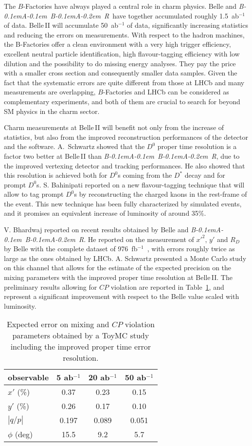\documentclass{PoS}
\def\babar{\mbox{\slshape B\kern-0.1em{\smaller A}\kern-0.1em
    B\kern-0.1em{\smaller A\kern-0.2em R}}}
\newcommand{\CP}{{\ensuremath{C\!P}}\xspace}
\newcommand{\Dz}{\ensuremath{D^0}\xspace}
\begin{document}
The $B$-Factories have always played a central role in charm
physics. Belle and \babar\ have together accumulated  roughly 1.5~ab$^{-1}$ of data. Belle\,II will accumulate 50~ab$^{-1}$ of data, significantly increasing
 statistics and reducing the errors on measurements.
With respect to the hadron machines, the B-Factories offer a clean
environment with a very high trigger efficiency, excellent neutral particle
identification, high flavour-tagging efficiency with low dilution and the
possibility to do missing energy analyses. They pay the price with a smaller
cross section and consequently smaller data samples. Given the fact
that the systematic
errors are quite different from those at LHCb and many measurements are
overlapping, $B$-Factories
and LHCb can be considered as complementary experiments, and both of them are crucial
to search for beyond SM physics in the charm sector.

Charm measurements at Belle\,II will benefit not only from the increase of
statistics, but also from the improved reconstruction performances of
the detector and the software. A.~Schwartz showed that the \Dz proper
time resolution is a factor two better at Belle\,II than \babar, due
to the improved vertexing detector and tracking performances. He also showed
that this resolution is achieved both for {\Dz}s coming from the $D^*$
decay and for prompt {\Dz}s. S. Bahinipati reported on a new
flavour-tagging technique that will allow to tag prompt {\Dz}s by
reconstructing the charged kaons in the rest-frame of the event. This new
technique has been fully characterized by simulated events, and it
promises an equivalent increase of luminosity of around 35\%.

V. Bhardwaj reported on recent results obtained by Belle and
\babar. He reported on the measurement of $x'^2$, $y'$ and $R_D$
by Belle with the complete dataset of 976~fb$^{-1}$~\cite{PhysRevLett.112.111801}, with errors roughly
twice as large as the ones obtained by LHCb. A. Schwartz presented
a Monte Carlo study on this channel that allows for the estimate of the
expected precision on the mixing parameters with the improved proper
time resolution at Belle\,II. The preliminary results allowing for \CP violation are
reported in Table~\ref{tab:toy}, and represent a significant
improvement with respect to the Belle value scaled with luminosity.
\begin{table}
\begin{center}
\begin{tabular}{l|c|c|c}
observable & 5 ab$^{-1}$& 20 ab$^{-1}$ & 50 ab$^{-1}$\\
\hline
$x'$ (\%) & 0.37 & 0.23 & 0.15\\
$y'$ (\%)& 0.26 & 0.17 & 0.10\\
$|q/p|$ & 0.197& 0.089& 0.051\\
$\phi$ (deg)& 15.5 & 9.2 &5.7\\
\end{tabular}
\caption[]{Expected error on mixing and \CP violation parameters obtained
by a ToyMC study including the improved proper time error resolution.}
\label{tab:toy}
\end{center}
\end{table}
\end{document}
